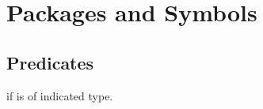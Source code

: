%
%

\section{Packages and Symbols}

\subsection{Predicates}
\begin{LIST}{1cm}

  {
    \retval{\T} if  is of indicated type.
  }

\end{LIST}


